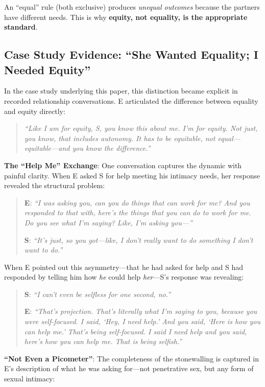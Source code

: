 \documentclass[12pt,openany]{book}
\numberwithin{equation}{chapter}
\begin{document}
An ``equal'' rule (both exclusive) produces \textit{unequal outcomes} because the partners have different needs. This is why \textbf{equity, not equality, is the appropriate standard}.

\subsection{Case Study Evidence: ``She Wanted Equality; I Needed Equity''}

In the case study underlying this paper, this distinction became explicit in recorded relationship conversations. E articulated the difference between equality and equity directly:

\begin{quote}
\textit{``Like I am for equity, S, you know this about me. I'm for equity. Not just, you know, that includes autonomy. It has to be equitable, not equal---equitable---and you know the difference.''}
\end{quote}

\textbf{The ``Help Me'' Exchange}: One conversation captures the dynamic with painful clarity. When E asked S for help meeting his intimacy needs, her response revealed the structural problem:

\begin{quote}
\textbf{E}: \textit{``I was asking you, can you do things that can work for me? And you responded to that with, here's the things that you can do to work for me. Do you see what I'm saying? Like, I'm asking you---''}

\textbf{S}: \textit{``It's just, so you got---like, I don't really want to do something I don't want to do.''}
\end{quote}

When E pointed out this asymmetry---that he had asked for help and S had responded by telling him how \textit{he} could help \textit{her}---S's response was revealing:

\begin{quote}
\textbf{S}: \textit{``I can't even be selfless for one second, no.''}

\textbf{E}: \textit{``That's projection. That's literally what I'm saying to you, because you were self-focused. I said, `Hey, I need help.' And you said, `Here is how you can help me.' That's being self-focused. I said I need help and you said, here's how you can help me. That is being selfish.''}
\end{quote}

\textbf{``Not Even a Picometer''}: The completeness of the stonewalling is captured in E's description of what he was asking for---not penetrative sex, but any form of sexual intimacy:
\end{document}
